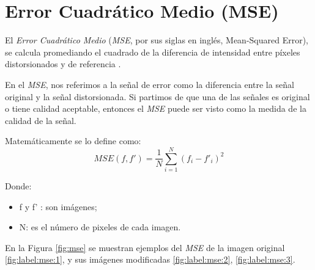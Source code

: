 \section{Error Cuadrático Medio (MSE)} 
\label{sec:mse}

El \textit{Error Cuadrático Medio} (\textit{MSE}, por sus siglas en inglés, Mean-Squared Error), se calcula promediando el cuadrado de la diferencia de intensidad entre píxeles distorsionados y de referencia \cite{wang2009}.


En el \textit{MSE}, nos referimos a la señal de error como la diferencia entre
la señal original y la señal distorsionada. Si partimos de que una de las señales es original o tiene calidad aceptable, entonces el \textit{MSE} puede ser visto como la medida de la calidad de la señal.


Matemáticamente se lo define como:
\begin{equation}\label{eq:mse}
MSE(f,f') = \frac{1}{N}\sum_{i=1}^{N}(f_{i} - {f'}_{i})^{2}
\end{equation}

Donde: 
\begin{itemize} 
    \item f y f' : son imágenes;
    \item N: es el número de pixeles de cada imagen.
\end{itemize}


En la Figura \ref{fig:mse} se muestran ejemplos del \textit{MSE} de la imagen original \ref{fig:label:mse:1}, y sus imágenes modificadas \ref{fig:label:mse:2}, \ref{fig:label:mse:3}.

